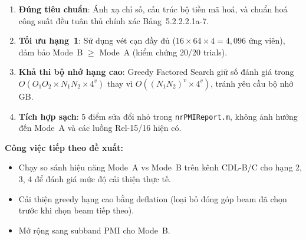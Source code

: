 \documentclass[11pt,a4paper]{article}
\begin{document}
\begin{enumerate}
  \item \textbf{Đúng tiêu chuẩn}: Ánh xạ chỉ số, cấu trúc bộ tiền mã hoá,
        và chuẩn hoá công suất đều tuân thủ chính xác Bảng~5.2.2.2.1a-7.

  \item \textbf{Tối ưu hạng~1}: Sử dụng vét cạn đầy đủ ($16 \times 64 \times 4 = 4{,}096$
        ứng viên), đảm bảo Mode~B $\geq$ Mode~A (kiểm chứng 20/20 trials).

  \item \textbf{Khả thi bộ nhớ hạng cao}: Greedy Factored Search giữ số
        đánh giá trong $O(O_1 O_2 \times N_1 N_2 \times 4^v)$ thay vì
        $O((N_1 N_2)^v \times 4^v)$, tránh yêu cầu bộ nhớ GB.

  \item \textbf{Tích hợp sạch}: 5 điểm sửa đổi nhỏ trong \texttt{nrPMIReport.m},
        không ảnh hưởng đến Mode~A và các luồng Rel-15/16 hiện có.
\end{enumerate}

\noindent\textbf{Công việc tiếp theo đề xuất:}
\begin{itemize}
  \item Chạy so sánh hiệu năng Mode~A vs Mode~B trên kênh CDL-B/C
        cho hạng 2, 3, 4 để đánh giá mức độ cải thiện thực tế.
  \item Cải thiện greedy hạng cao bằng deflation (loại bỏ đóng góp beam đã chọn
        trước khi chọn beam tiếp theo).
  \item Mở rộng sang subband PMI cho Mode~B.
\end{itemize}
\end{document}
